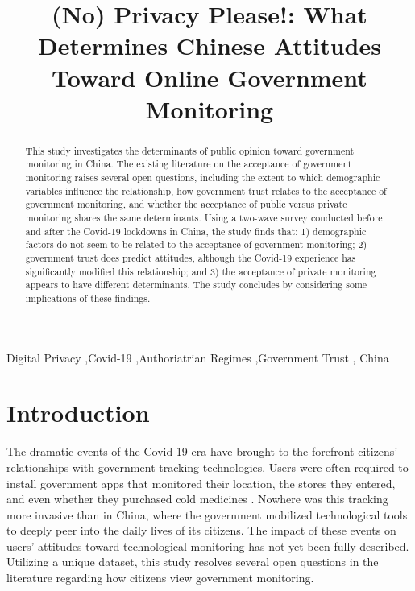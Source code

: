 \documentclass[
  number]{elsarticle}
\begin{document}
\begin{frontmatter}
\title{(No) Privacy Please!: What Determines Chinese Attitudes Toward
Online Government Monitoring}


        
\begin{abstract}
This study investigates the determinants of public opinion toward
government monitoring in China. The existing literature on the
acceptance of government monitoring raises several open questions,
including the extent to which demographic variables influence the
relationship, how government trust relates to the acceptance of
government monitoring, and whether the acceptance of public versus
private monitoring shares the same determinants. Using a two-wave survey
conducted before and after the Covid-19 lockdowns in China, the study
finds that: 1) demographic factors do not seem to be related to the
acceptance of government monitoring; 2) government trust does predict
attitudes, although the Covid-19 experience has significantly modified
this relationship; and 3) the acceptance of private monitoring appears
to have different determinants. The study concludes by considering some
implications of these findings.
\end{abstract}





\begin{keyword}
    Digital Privacy \sep Covid-19 \sep Authoriatrian
Regimes \sep Government Trust \sep 
    China
\end{keyword}
\end{frontmatter}
    
\section{Introduction}\label{sec-introduction}

The dramatic events of the Covid-19 era have brought to the forefront
citizens' relationships with government tracking technologies. Users
were often required to install government apps that monitored their
location, the stores they entered, and even whether they purchased cold
medicines \citep{mcmorrow2022}. Nowhere was this tracking more invasive
than in China, where the government mobilized technological tools to
deeply peer into the daily lives of its citizens. The impact of these
events on users' attitudes toward technological monitoring has not yet
been fully described. Utilizing a unique dataset, this study resolves
several open questions in the literature regarding how citizens view
government monitoring.
\end{document}
